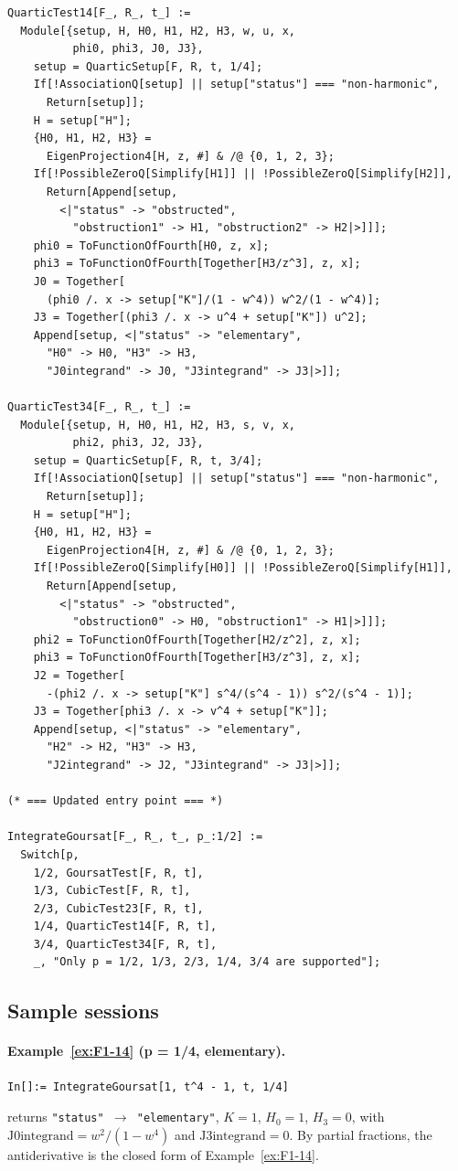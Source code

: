 \documentclass[11pt,a4paper]{article}
\theoremstyle{plain}
\theoremstyle{definition}
\theoremstyle{remark}
\begin{document}
\begin{lstlisting}
QuarticTest14[F_, R_, t_] :=
  Module[{setup, H, H0, H1, H2, H3, w, u, x,
          phi0, phi3, J0, J3},
    setup = QuarticSetup[F, R, t, 1/4];
    If[!AssociationQ[setup] || setup["status"] === "non-harmonic",
      Return[setup]];
    H = setup["H"];
    {H0, H1, H2, H3} =
      EigenProjection4[H, z, #] & /@ {0, 1, 2, 3};
    If[!PossibleZeroQ[Simplify[H1]] || !PossibleZeroQ[Simplify[H2]],
      Return[Append[setup,
        <|"status" -> "obstructed",
          "obstruction1" -> H1, "obstruction2" -> H2|>]]];
    phi0 = ToFunctionOfFourth[H0, z, x];
    phi3 = ToFunctionOfFourth[Together[H3/z^3], z, x];
    J0 = Together[
      (phi0 /. x -> setup["K"]/(1 - w^4)) w^2/(1 - w^4)];
    J3 = Together[(phi3 /. x -> u^4 + setup["K"]) u^2];
    Append[setup, <|"status" -> "elementary",
      "H0" -> H0, "H3" -> H3,
      "J0integrand" -> J0, "J3integrand" -> J3|>]];

QuarticTest34[F_, R_, t_] :=
  Module[{setup, H, H0, H1, H2, H3, s, v, x,
          phi2, phi3, J2, J3},
    setup = QuarticSetup[F, R, t, 3/4];
    If[!AssociationQ[setup] || setup["status"] === "non-harmonic",
      Return[setup]];
    H = setup["H"];
    {H0, H1, H2, H3} =
      EigenProjection4[H, z, #] & /@ {0, 1, 2, 3};
    If[!PossibleZeroQ[Simplify[H0]] || !PossibleZeroQ[Simplify[H1]],
      Return[Append[setup,
        <|"status" -> "obstructed",
          "obstruction0" -> H0, "obstruction1" -> H1|>]]];
    phi2 = ToFunctionOfFourth[Together[H2/z^2], z, x];
    phi3 = ToFunctionOfFourth[Together[H3/z^3], z, x];
    J2 = Together[
      -(phi2 /. x -> setup["K"] s^4/(s^4 - 1)) s^2/(s^4 - 1)];
    J3 = Together[phi3 /. x -> v^4 + setup["K"]];
    Append[setup, <|"status" -> "elementary",
      "H2" -> H2, "H3" -> H3,
      "J2integrand" -> J2, "J3integrand" -> J3|>]];

(* === Updated entry point === *)

IntegrateGoursat[F_, R_, t_, p_:1/2] :=
  Switch[p,
    1/2, GoursatTest[F, R, t],
    1/3, CubicTest[F, R, t],
    2/3, CubicTest23[F, R, t],
    1/4, QuarticTest14[F, R, t],
    3/4, QuarticTest34[F, R, t],
    _, "Only p = 1/2, 1/3, 2/3, 1/4, 3/4 are supported"];
\end{lstlisting}

\subsection*{Sample sessions}

\paragraph{Example~\ref{ex:F1-14} (p = 1/4, elementary).}
\begin{lstlisting}[basicstyle=\footnotesize\ttfamily,frame=none]
In[]:= IntegrateGoursat[1, t^4 - 1, t, 1/4]
\end{lstlisting}
returns \texttt{"status"\,$\to$\,"elementary"}, $K = 1$, $H_0 = 1$, $H_3 = 0$, with $\text{J0integrand} = w^2/(1-w^4)$ and $\text{J3integrand} = 0$. By partial fractions, the antiderivative is the closed form of Example~\ref{ex:F1-14}.
\end{document}
